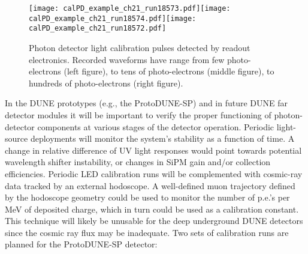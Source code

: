%
 \begin{figure}[hhh!!!]
  \centering

\texttt{[image: calPD\_example\_ch21\_run18573.pdf]}\texttt{[image: calPD\_example\_ch21\_run18574.pdf]}\texttt{[image: calPD\_example\_ch21\_run18572.pdf]}
\caption{Photon detector light calibration pulses detected by readout electronics. Recorded waveforms have range from few photo-electrons (left figure), to tens of photo-electrons (middle figure), to hundreds of photo-electrons (right figure).}
\label{fig:fig-wf}
\end{figure}
%
In the DUNE prototypes (e.g., the ProtoDUNE-SP) and in future DUNE far detector modules it will be important to %
verify the proper functioning of photon-detector components %
at various stages of the detector operation. 
Periodic light-source deployments will monitor the system's stability as a function of time. A change in relative difference of UV light responses would point towards potential wavelength shifter instability, 
or changes in SiPM gain and/or collection efficiencies. %
Periodic LED calibration runs will be complemented 
with cosmic-ray data tracked by an external hodoscope. 
A well-defined muon trajectory defined by the hodoscope geometry could be used to monitor the number of p.e.'s per MeV of deposited charge, which in turn 
could be used as a calibration constant. This technique will likely be unusable 
for the deep underground DUNE detectors since the cosmic ray flux may be inadequate. %
	Two sets of calibration runs are planned for the ProtoDUNE-SP detector: 
